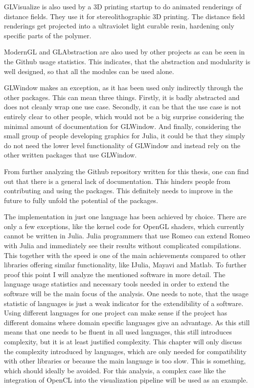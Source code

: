 GLVisualize is also used by a 3D printing startup\cite{AddSub} to do animated renderings of distance fields.
They use it for stereolithographic 3D printing. 
The distance field renderings get projected into a ultraviolet light curable resin, hardening only specific parts of the polymer.

ModernGL and GLAbstraction are also used by other projects as can be seen in the Github usage statistics.
This indicates, that the abstraction and modularity is well designed, so that all the modules can be used alone.

GLWindow makes an exception, as it has been used only indirectly through the other packages. 
This can mean three things.
Firstly, it is badly abstracted and does not cleanly wrap one use case.
Secondly, it can be that the use case is not entirely clear to other people, which would not be a big surprise considering the minimal amount of documentation for GLWindow.
And finally, considering the small group of people developing graphics for Julia, it could be that they simply do not need the lower level functionality of GLWindow and instead rely on the other written packages that use GLWindow.

From further analyzing the Github repository written for this thesis, one can find out that there is a general lack of documentation.
This hinders people from contributing and using the packages. This definitely needs to improve in the future to fully unfold the potential of the packages.

The implementation in just one language has been achieved by choice. 
There are only a few exceptions, like the kernel code for OpenGL shaders, which currently cannot be written in Julia. 
Julia programmers that use Romeo can extend Romeo with Julia and immediately see their results without complicated compilations.
This together with the speed is one of the main achievements compared to other libraries offering similar functionality, like IJulia, Mayavi and Matlab.
To further proof this point I will analyze the mentioned software in more detail.
The language usage statistics and necessary tools needed in order to extend the software will be the main focus of the analysis.
One needs to note, that the usage statistic of languages is just a weak indicator for the extendibility of a software.
Using different languages for one project can make sense if the project has different domains where domain specific languages give an advantage. 
As this still means that one needs to be fluent in all used languages, this still introduces complexity, but it is at least justified complexity.
This chapter will only discuss the complexity introduced by languages, which are only needed for compatibility with other libraries or because the main language is too slow. 
This is something, which should ideally be avoided.
For this analysis, a complex case like the integration of \ac{OpenCL} into the visualization pipeline will be used as an example.


